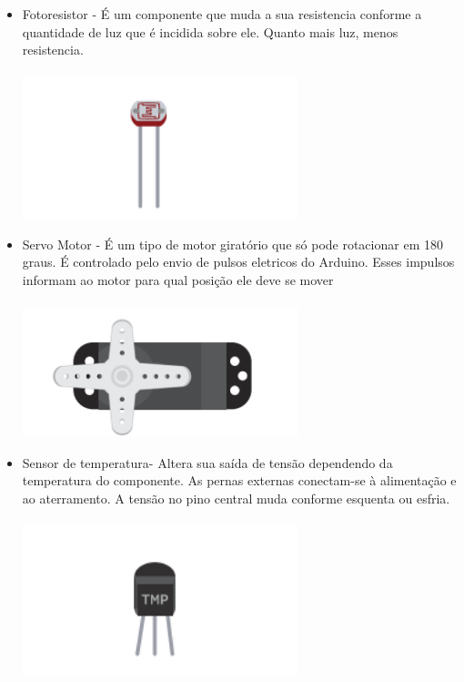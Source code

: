 \documentclass{report}
\begin{document}
\begin{itemize}
		\item Fotoresistor - É um componente que muda a sua resistencia conforme a quantidade de luz que é incidida sobre ele. Quanto mais luz, menos resistencia.\\ \\
		\includegraphics[width=8cm]{imagens/fotoresistor.png}
		
		\item Servo Motor - É um tipo de motor giratório que só pode rotacionar em 180 graus. É controlado pelo envio de pulsos eletricos do Arduino. Esses impulsos informam ao motor para qual posição ele deve se mover\\ \\
		\includegraphics[width=8cm]{imagens/servo_motor.png}
		
		\item Sensor de temperatura- Altera sua saída de tensão dependendo da temperatura do componente. As pernas externas conectam-se à alimentação e
		ao aterramento. A tensão no pino central muda
		conforme esquenta ou esfria. \\ \\
		\includegraphics[width=8cm]{imagens/sensor_temperatura.png}
		

\end{itemize}
\end{document}
